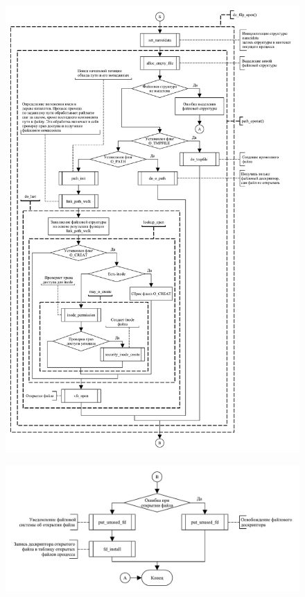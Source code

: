 \begin{figure}[H]
    \centering
    \includegraphics[scale=0.55]{../schema/open_02.pdf}
\end{figure}

\begin{figure}[H]
    \centering
    \includegraphics[scale=0.65]{../schema/open_03.pdf}
\end{figure}
